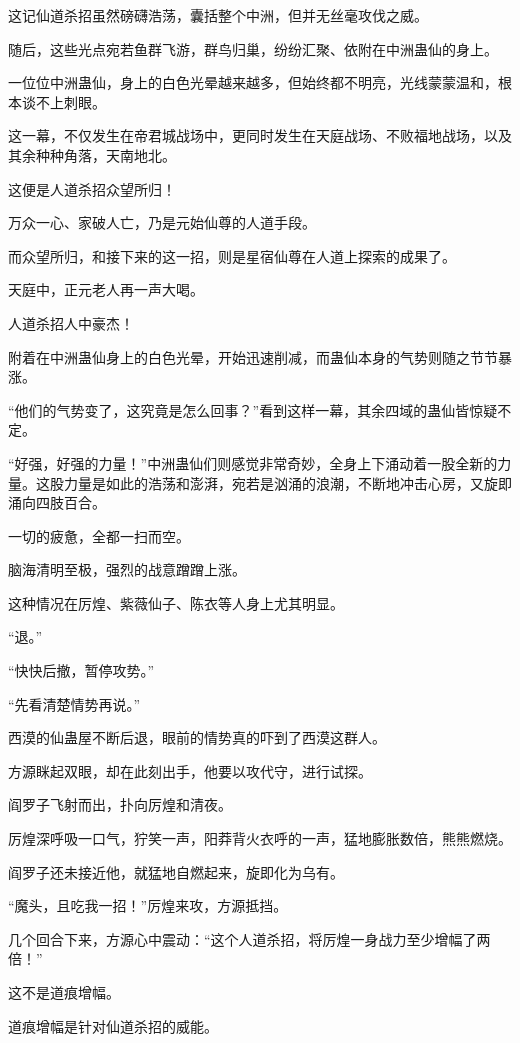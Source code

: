 \begin{this_body}
这记仙道杀招虽然磅礴浩荡，囊括整个中洲，但并无丝毫攻伐之威。

随后，这些光点宛若鱼群飞游，群鸟归巢，纷纷汇聚、依附在中洲蛊仙的身上。

一位位中洲蛊仙，身上的白色光晕越来越多，但始终都不明亮，光线蒙蒙温和，根本谈不上刺眼。

这一幕，不仅发生在帝君城战场中，更同时发生在天庭战场、不败福地战场，以及其余种种角落，天南地北。

这便是人道杀招众望所归！

万众一心、家破人亡，乃是元始仙尊的人道手段。

而众望所归，和接下来的这一招，则是星宿仙尊在人道上探索的成果了。

天庭中，正元老人再一声大喝。

人道杀招人中豪杰！

附着在中洲蛊仙身上的白色光晕，开始迅速削减，而蛊仙本身的气势则随之节节暴涨。

“他们的气势变了，这究竟是怎么回事？”看到这样一幕，其余四域的蛊仙皆惊疑不定。

“好强，好强的力量！”中洲蛊仙们则感觉非常奇妙，全身上下涌动着一股全新的力量。这股力量是如此的浩荡和澎湃，宛若是汹涌的浪潮，不断地冲击心房，又旋即涌向四肢百合。

一切的疲惫，全都一扫而空。

脑海清明至极，强烈的战意蹭蹭上涨。

这种情况在厉煌、紫薇仙子、陈衣等人身上尤其明显。

“退。”

“快快后撤，暂停攻势。”

“先看清楚情势再说。”

西漠的仙蛊屋不断后退，眼前的情势真的吓到了西漠这群人。

方源眯起双眼，却在此刻出手，他要以攻代守，进行试探。

阎罗子飞射而出，扑向厉煌和清夜。

厉煌深呼吸一口气，狞笑一声，阳莽背火衣呼的一声，猛地膨胀数倍，熊熊燃烧。

阎罗子还未接近他，就猛地自燃起来，旋即化为乌有。

“魔头，且吃我一招！”厉煌来攻，方源抵挡。

几个回合下来，方源心中震动：“这个人道杀招，将厉煌一身战力至少增幅了两倍！”

这不是道痕增幅。

道痕增幅是针对仙道杀招的威能。


\end{this_body}
